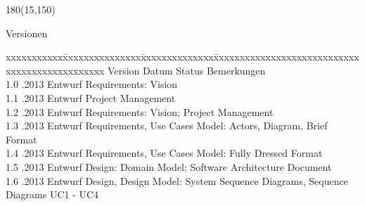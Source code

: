 
\begin{textblock}{180}(15,150)
\color{black}
\begin{huge}
Versionen
\end{huge}
\vspace{10mm}

\fontsize{10pt}{18pt}\selectfont
\begin{tabbing}
xxxxxxxxxxx\=xxxxxxxxxxxxxxx\=xxxxxxxxxxxxxx\=xxxxxxxxxxxxxxxxxxxxxxxxxxxxxxxxxxxxxxxxxxxxxxx \kill
Version	\> Datum	\> Status		\> Bemerkungen \\
1.0	.2013	\> Entwurf		\> Requirements: Vision \\
1.1	.2013	\> Entwurf		\> Project Management \\
1.2	.2013	\> Entwurf		\> Requirements: Vision; Project Management \\
1.3	.2013	\> Entwurf		\> Requirements, Use Cases Model: Actors, Diagram, Brief Format \\
1.4	.2013	\> Entwurf		\> Requirements, Use Cases Model: Fully Dressed Format \\
1.5	.2013	\> Entwurf		\> Design: Domain Model; Software Architecture Document \\
1.6	.2013	\> Entwurf		\> Design, Design Model: System Sequence Diagrams, Sequence Diagrams UC1 - UC4 \\
\end{tabbing}

\end{textblock}

